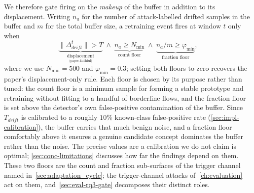 We therefore gate firing on the \emph{makeup} of the buffer in addition to its displacement. Writing $n_a$ for the number of attack-labelled drifted samples in the buffer and $m$ for the total buffer size, a retraining event fires at window $t$ only when
\begin{equation} \label{eq:firing-predicate}
\underbrace{\|\Delta_{drift}^{t}\| > T}_{\underset{\text{(paper-faithful)}}{\text{displacement}}}
\;\wedge\;
\underbrace{n_a \ge N_{\min}}_{\text{count floor}}
\;\wedge\;
\underbrace{n_a/m \ge \varphi_{\min}}_{\text{fraction floor}},
\end{equation}
where we use $N_{\min} = 500$ and $\varphi_{\min} = 0.3$; setting both floors to zero recovers the paper's displacement-only rule. Each floor is chosen by its purpose rather than tuned: the count floor is a minimum sample for forming a stable prototype and retraining without fitting to a handful of borderline flows, and the fraction floor is set above the detector's own false-positive contamination of the buffer. Since $T_{drift}$ is calibrated to a roughly $10\%$ known-class false-positive rate (\cref{sec:impl-calibration}), the buffer carries that much benign noise, and a fraction floor comfortably above it ensures a genuine candidate concept dominates the buffer rather than the noise. The precise values are a calibration we do not claim is optimal; \cref{sec:conc-limitations} discusses how far the findings depend on them. These two floors are the count and fraction sub-surfaces of the trigger channel named in~\cref{sec:adaptation_cycle}; the trigger-channel attacks of~\cref{ch:evaluation} act on them, and~\cref{sec:eval-rq3-gate} decomposes their distinct roles.

